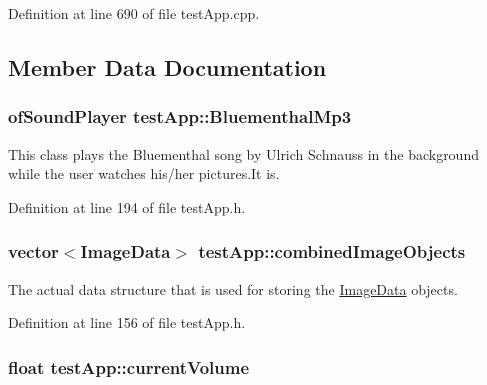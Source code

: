 Definition at line 690 of file test\-App.\-cpp.



\subsection{Member Data Documentation}
\hypertarget{classtest_app_af696fd13ee9ecb38ac0ba0b72543ce06}{
\subsubsection[{Bluementhal\-Mp3}]{\setlength{\rightskip}{0pt plus 5cm}of\-Sound\-Player test\-App\-::\-Bluementhal\-Mp3}}\label{classtest_app_af696fd13ee9ecb38ac0ba0b72543ce06}


This class plays the Bluementhal song by Ulrich Schnauss in the background while the user watches his/her pictures.\-It is. 



Definition at line 194 of file test\-App.\-h.

\hypertarget{classtest_app_aced9b8a8419c8465877c2c9cd43f8934}{
\subsubsection[{combined\-Image\-Objects}]{\setlength{\rightskip}{0pt plus 5cm}vector$<${\bf Image\-Data}$>$ test\-App\-::combined\-Image\-Objects}}\label{classtest_app_aced9b8a8419c8465877c2c9cd43f8934}


The actual data structure that is used for storing the \hyperlink{struct_image_data}{Image\-Data} objects. 



Definition at line 156 of file test\-App.\-h.

\hypertarget{classtest_app_a51c20c5432d9f6b06f719526d9a34ee6}{
\subsubsection[{current\-Volume}]{\setlength{\rightskip}{0pt plus 5cm}float test\-App\-::current\-Volume}}\label{classtest_app_a51c20c5432d9f6b06f719526d9a34ee6}


